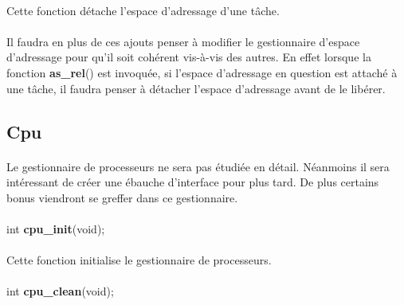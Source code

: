 \documentclass[10pt,a4wide]{article}
\begin{document}
\paragraph{}

Cette fonction d\'etache l'espace d'adressage d'une t\^ache.

\paragraph{}

Il faudra en plus de ces ajouts penser \`a modifier le gestionnaire d'espace
d'adressage pour qu'il soit coh\'erent vis-\`a-vis des autres. En effet
lorsque la fonction \textbf{as\_rel}() est invoqu\'ee, si l'espace
d'adressage en question est attach\'e \`a une t\^ache, il faudra penser
\`a d\'etacher l'espace d'adressage avant de le lib\'erer.

\subsection{Cpu}

\paragraph{}

Le gestionnaire de processeurs ne sera pas \'etudi\'ee en d\'etail. N\'eanmoins
il sera int\'eressant de cr\'eer une \'ebauche d'interface pour plus tard.
De plus certains bonus viendront se greffer dans ce gestionnaire.

\paragraph{}

\hspace{1.5cm}int \textbf{cpu\_init}(void);

\paragraph{}

Cette fonction initialise le gestionnaire de processeurs.

\paragraph{}

\hspace{1.5cm}int \textbf{cpu\_clean}(void);
\end{document}
